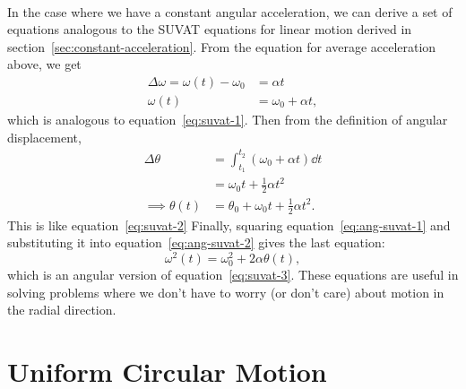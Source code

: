 \documentclass[../classical_mechanics.tex]{subfiles}
\begin{document}
        \paragraph{}
        In the case where we have a constant angular acceleration, we can derive a set of equations analogous to the SUVAT equations for linear motion derived in section~\ref{sec:constant-acceleration}.
        From the equation for average acceleration above, we get
        \begin{align}
            \Delta\omega=\omega(t)-\omega_0&=\alpha t\\
            \omega(t)&=\omega_0+\alpha t,\label{eq:ang-suvat-1}
        \end{align}
        which is analogous to equation~\ref{eq:suvat-1}.
        Then from the definition of angular displacement,
        \begin{align}
            \Delta\theta&=\int_{t_1}^{t_2}(\omega_0+\alpha t)\dd{t}\\
            &=\omega_0t+\frac{1}{2}\alpha t^2\\
            \implies\theta(t)&=\theta_0+\omega_0t+\frac{1}{2}\alpha t^2.\label{eq:ang-suvat-2}
        \end{align}
        This is like equation~\ref{eq:suvat-2}
        Finally, squaring equation~\ref{eq:ang-suvat-1} and substituting it into equation~\ref{eq:ang-suvat-2} gives the last equation:
        \begin{equation}
            \omega^2(t)=\omega_0^2+2\alpha\theta(t),\label{eq:ang-suvat-3}
        \end{equation}
        which is an angular version of equation~\ref{eq:suvat-3}.
        These equations are useful in solving problems where we don't have to worry (or don't care) about motion in the radial direction.

    \section{Uniform Circular Motion}\label{sec:uniform-circular-motion}
\end{document}
